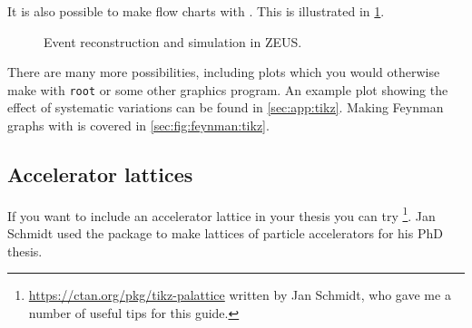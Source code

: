 It is also possible to make flow charts with \TikZ.
This is illustrated in \cref{fig:tikz:flow}.

\begin{figure}[htbp]
  \centering
  
  \caption[Event reconstruction and simulation in ZEUS]{Event reconstruction and simulation in ZEUS.}%
  \label{fig:tikz:flow}
\end{figure}

There are many more possibilities,
including plots which you would otherwise make with \texttt{root} or
some other graphics program. An example plot showing the effect of
systematic variations can be found in \cref{sec:app:tikz}. Making
Feynman graphs with \TikZ is covered in \cref{sec:fig:feynman:tikz}.


\subsection{Accelerator lattices}%
\label{sec:fig:accelerator}

If you want to include an accelerator lattice in your thesis you can try
\footnote{%
  \url{https://ctan.org/pkg/tikz-palattice}
written by Jan Schmidt, who gave me a number of useful tips for this guide.}.
Jan Schmidt used the package to make lattices of particle accelerators for his PhD thesis.

